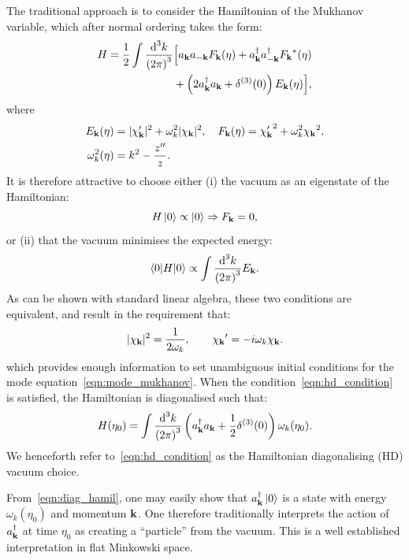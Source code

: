 The traditional approach is to consider the Hamiltonian of the Mukhanov variable, which after normal ordering takes the form:
\begin{align}
  H = \frac{1}{2}\int\frac{\d[3]{k}}{{(2\pi)}^3} 
  &\Big[ a_\vk a_{-\vk} F_\vk(\eta) + a_\vk^\dagger a_{-\vk}^\dagger \str{F_\vk}(\eta) \nonumber \\
  &+ \left(2a_\vk^\dagger a_\vk + \delta^{(3)}(0)\right)E_\vk(\eta) \Big], 
\end{align}
where
\begin{align}
  E_\vk(\eta) &= |\chi_\vk^\prime|^2 + \omega_k^2|\chi_\vk|^2,\quad
  F_\vk(\eta) = {\chi_\vk^\prime}^2 + \omega_k^2{\chi_\vk}^2,\\
  \omega_k^2(\eta) &= k^2-\frac{\dprm{z}}{z}.
  \label{eqn:def_omega}
\end{align}
It is therefore attractive to choose either (i) the vacuum as an eigenstate of the Hamiltonian:
\begin{equation}
  H\ket{0}\propto\ket{0} \Rightarrow F_\vk=0,
  \label{eqn:eigenstate}
\end{equation}
or (ii) that the vacuum minimises the expected energy:
\begin{equation}
  \bracket{0}{H}{0} \propto \int \frac{\d[3]{k}}{{(2\pi)}^3} E_\vk.
  \label{eqn:hamil}
\end{equation}
As can be shown with standard linear algebra, these two conditions are equivalent, and result in the requirement that:
\begin{equation}
  |\chi_\vk|^2 = \frac{1}{2\omega_k}, \qquad \prm{\chi_\vk} = -i \omega_k \chi_\vk.
  \label{eqn:hd_condition}
\end{equation}
which provides enough information to set unambiguous initial conditions for the mode equation~\eqref{eqn:mode_mukhanov}.
When the condition~\eqref{eqn:hd_condition} is satisfied, the Hamiltonian is diagonalised such that:
\begin{equation}
  H(\eta_0) = \int\frac{\d[3]{k}}{{(2\pi)}^3} 
  \left(a_\vk^\dagger a_\vk + \frac{1}{2}\delta^{(3)}(0)\right)\omega_k(\eta_0). 
  \label{eqn:diag_hamil}
\end{equation}
We henceforth refer to~\eqref{eqn:hd_condition} as the Hamiltonian diagonalising (HD) vacuum choice.

From~\eqref{eqn:diag_hamil}, one may easily show that $a_\vk^\dagger\ket{0}$ is a state with energy $\omega_k(\eta_0)$ and momentum $\vk$. One therefore traditionally interprets the action of $a_\vk^\dagger$ at time $\eta_0$ as creating a ``particle'' from the vacuum. This is a well established interpretation in flat Minkowski space. %

